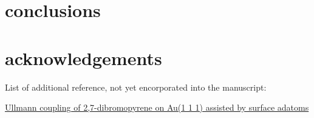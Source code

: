 \documentclass[%
 reprint,
 amsmath,amssymb,
 aps,
prb,
]{revtex4-2}
\begin{document}
\section{conclusions}

\section{acknowledgements}






List of additional reference, not yet encorporated into the manuscript:

\href{https://doi.org/10.1016/j.apsusc.2020.145797}{Ullmann coupling of 2,7-dibromopyrene on Au(1 1 1) assisted by surface adatoms}










\nocite{*}

\end{document}
